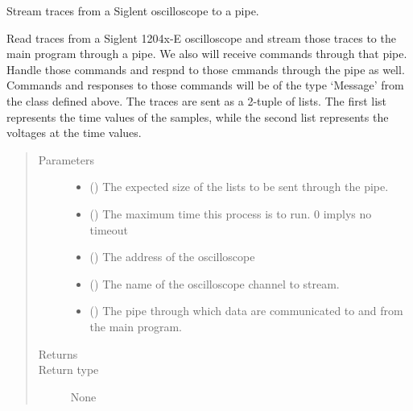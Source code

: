 \documentclass[letterpaper,10pt,english]{sphinxmanual}
\begin{document}
\begin{fulllineitems}
\label{\detokenize{index:background.main}}
Stream traces from a Siglent oscilloscope to a pipe.

Read traces from a Siglent 1204x-E oscilloscope and stream those
traces to the main program through a pipe.  We also will receive
commands through that pipe.  Handle those commands and respnd to
those cmmands through the pipe as well.  Commands and responses to
those commands will be of the type ‘Message’ from the class
defined above.  The traces are sent as a 2-tuple of lists.  The
first list represents the time values of the samples, while the
second list represents the voltages at the time values.
\begin{quote}\begin{description}
\item[{Parameters}] \leavevmode\begin{itemize}
\item {} 
 () \textendash{} The expected size of the lists to be sent through
the pipe.

\item {} 
 () \textendash{} The maximum time this process is to run.  0
implys no timeout

\item {} 
 () \textendash{} The  address of the oscilloscope

\item {} 
 () \textendash{} The name of the oscilloscope channel to stream.

\item {} 
 () \textendash{} The pipe through which data are communicated to
and from the main program.

\end{itemize}

\item[{Returns}] \leavevmode
{}

\item[{Return type}] \leavevmode
None

\end{description}\end{quote}

\end{fulllineitems}
\end{document}

